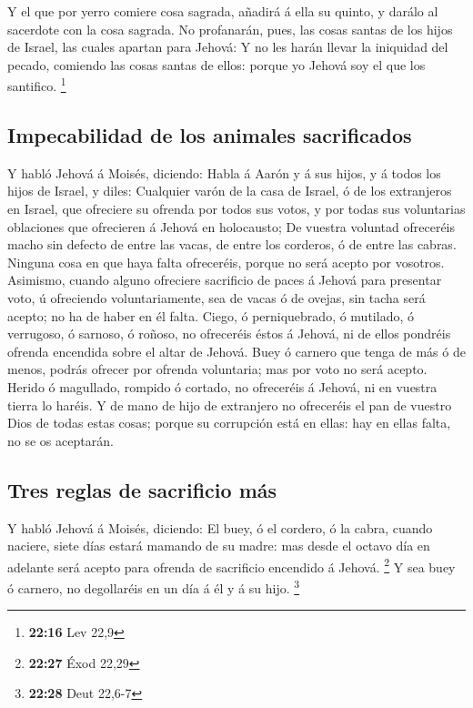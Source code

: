  Y el que por yerro comiere cosa sagrada, añadirá á ella su
quinto, y darálo al sacerdote con la cosa sagrada.  No
profanarán, pues, las cosas santas de los hijos de Israel, las cuales
apartan para Jehová:  Y no les harán llevar la iniquidad
del pecado, comiendo las cosas santas de ellos: porque yo Jehová soy el
que los santifico. \footnote{\textbf{22:16} Lev 22,9}

\hypertarget{impecabilidad-de-los-animales-sacrificados}{%
\subsection{Impecabilidad de los animales
sacrificados}\label{impecabilidad-de-los-animales-sacrificados}}

 Y habló Jehová á Moisés, diciendo:  Habla á
Aarón y á sus hijos, y á todos los hijos de Israel, y diles: Cualquier
varón de la casa de Israel, ó de los extranjeros en Israel, que
ofreciere su ofrenda por todos sus votos, y por todas sus voluntarias
oblaciones que ofrecieren á Jehová en holocausto;  De
vuestra voluntad ofreceréis macho sin defecto de entre las vacas, de
entre los corderos, ó de entre las cabras.  Ninguna cosa en
que haya falta ofreceréis, porque no será acepto por vosotros.
 Asimismo, cuando alguno ofreciere sacrificio de paces á
Jehová para presentar voto, ú ofreciendo voluntariamente, sea de vacas ó
de ovejas, sin tacha será acepto; no ha de haber en él falta.
 Ciego, ó perniquebrado, ó mutilado, ó verrugoso, ó
sarnoso, ó roñoso, no ofreceréis éstos á Jehová, ni de ellos pondréis
ofrenda encendida sobre el altar de Jehová.  Buey ó carnero
que tenga de más ó de menos, podrás ofrecer por ofrenda voluntaria; mas
por voto no será acepto.  Herido ó magullado, rompido ó
cortado, no ofreceréis á Jehová, ni en vuestra tierra lo haréis.
 Y de mano de hijo de extranjero no ofreceréis el pan de
vuestro Dios de todas estas cosas; porque su corrupción está en ellas:
hay en ellas falta, no se os aceptarán.

\hypertarget{tres-reglas-de-sacrificio-muxe1s}{%
\subsection{Tres reglas de sacrificio
más}\label{tres-reglas-de-sacrificio-muxe1s}}

 Y habló Jehová á Moisés, diciendo:  El buey,
ó el cordero, ó la cabra, cuando naciere, siete días estará mamando de
su madre: mas desde el octavo día en adelante será acepto para ofrenda
de sacrificio encendido á Jehová. \footnote{\textbf{22:27} Éxod 22,29}
 Y sea buey ó carnero, no degollaréis en un día á él y á su
hijo. \footnote{\textbf{22:28} Deut 22,6-7}


